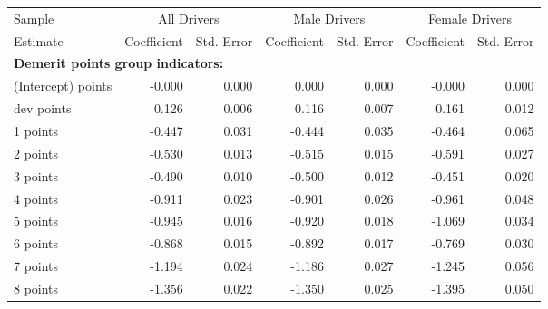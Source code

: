 
\begin{table}%
\centering 
\begin{tabular}{l r r r r r r} 

\hline 
 

Sample 
 & \multicolumn{2}{c}{All  Drivers}  & \multicolumn{2}{c}{Male  Drivers}  & \multicolumn{2}{c}{Female  Drivers}   \\ 
 

 \cmidrule(lr){1-1}\cmidrule(lr){2-3}\cmidrule(lr){4-5}\cmidrule(lr){6-7} 

Estimate  & Coefficient & Std. Error  & Coefficient & Std. Error  & Coefficient & Std. Error   \\ 
 

\hline 
 
\multicolumn{4}{l}{\textbf{Demerit points group indicators:}}  \\ 
 
(Intercept) points  & -0.000  &  0.000  &  0.000  &  0.000  & -0.000  &  0.000   \\ 
 
dev points  &  0.126  &  0.006  &  0.116  &  0.007  &  0.161  &  0.012   \\ 
 
1 points  & -0.447  &  0.031  & -0.444  &  0.035  & -0.464  &  0.065   \\ 
 
2 points  & -0.530  &  0.013  & -0.515  &  0.015  & -0.591  &  0.027   \\ 
 
3 points  & -0.490  &  0.010  & -0.500  &  0.012  & -0.451  &  0.020   \\ 
 
4 points  & -0.911  &  0.023  & -0.901  &  0.026  & -0.961  &  0.048   \\ 
 
5 points  & -0.945  &  0.016  & -0.920  &  0.018  & -1.069  &  0.034   \\ 
 
6 points  & -0.868  &  0.015  & -0.892  &  0.017  & -0.769  &  0.030   \\ 
 
7 points  & -1.194  &  0.024  & -1.186  &  0.027  & -1.245  &  0.056   \\ 
 
8 points  & -1.356  &  0.022  & -1.350  &  0.025  & -1.395  &  0.050   \\ 
 

\end{tabular}
\end{table}
